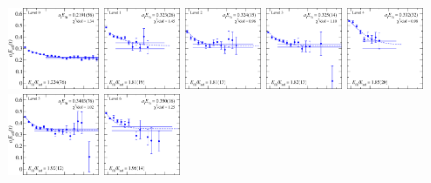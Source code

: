 \begin{figure}[H]
    \includegraphics[width=0.215\textwidth]{figures/sigmas/g1g/fits/fit_0.pdf}
    \includegraphics[width=0.18\textwidth]{figures/sigmas/g1g/fits/fit_7.pdf}
    \includegraphics[width=0.18\textwidth]{figures/sigmas/g1g/fits/fit_3.pdf}
    \includegraphics[width=0.18\textwidth]{figures/sigmas/g1g/fits/fit_4.pdf}
    \includegraphics[width=0.18\textwidth]{figures/sigmas/g1g/fits/fit_21.pdf}\\
    \includegraphics[width=0.215\textwidth]{figures/sigmas/g1g/fits/fit_5.pdf}
    \includegraphics[width=0.18\textwidth]{figures/sigmas/g1g/fits/fit_9.pdf}

\end{figure}
